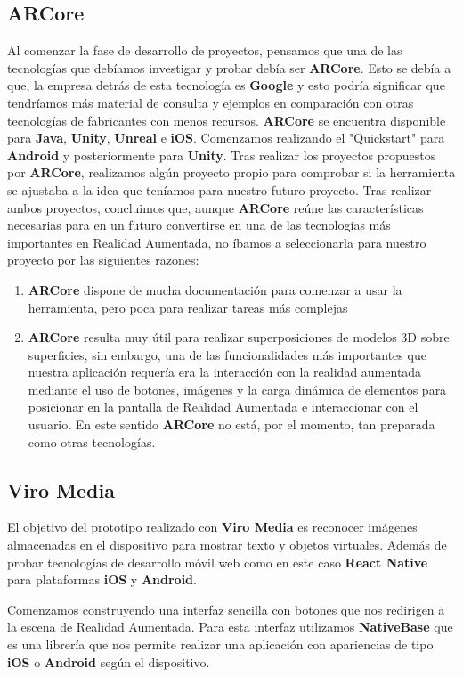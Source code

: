 \subsection{ARCore} 
\label{makereference3.6.1} 
\begin{flushleft}
    Al comenzar la fase de desarrollo de proyectos, pensamos que una de las tecnologías que debíamos 
    investigar y probar debía ser \textbf{ARCore}. Esto se debía a que, la empresa detrás de esta 
    tecnología es \textbf{Google} y esto podría significar que tendríamos más material de consulta 
    y ejemplos en comparación con otras tecnologías de fabricantes con menos recursos.
    \textbf{ARCore} se encuentra disponible para \textbf{Java}, \textbf{Unity}, \textbf{Unreal} e \textbf{iOS}. Comenzamos realizando el 
    "Quickstart" para \textbf{Android} y posteriormente para \textbf{Unity}. 
    Tras realizar los proyectos propuestos por \textbf{ARCore}, realizamos algún proyecto propio 
    para comprobar si la herramienta se ajustaba a la idea que teníamos para nuestro futuro proyecto.
    Tras realizar ambos proyectos, concluimos que, aunque \textbf{ARCore} reúne las características 
    necesarias para en un futuro convertirse en una de las tecnologías más importantes en Realidad Aumentada, 
    no íbamos a seleccionarla para nuestro proyecto por las siguientes razones:
    \begin{enumerate}
        \item \textbf{ARCore} dispone de mucha documentación para comenzar a usar la herramienta, pero poca para realizar tareas más complejas
        \item \textbf{ARCore} resulta muy útil para realizar superposiciones de modelos 3D sobre superficies, sin embargo, una de las funcionalidades más importantes que nuestra aplicación requería era la interacción con la realidad aumentada mediante el uso de botones, imágenes y la carga dinámica de elementos para posicionar en la pantalla de Realidad Aumentada e interaccionar con el usuario. En este sentido \textbf{ARCore} no está, por el momento, tan preparada como otras tecnologías.
    \end{enumerate}
    
\end{flushleft}
\subsection{Viro Media} 
\label{makereference3.6.2}
\begin{flushleft}
El objetivo del prototipo realizado con \textbf{Viro Media} es reconocer imágenes almacenadas en el dispositivo para mostrar texto y
 objetos virtuales. Además de probar tecnologías de desarrollo móvil web como en este caso \textbf{React Native}
 para plataformas \textbf{iOS} y \textbf{Android}.
\end{flushleft}
\begin{flushleft}
Comenzamos construyendo una interfaz sencilla con botones que nos redirigen a la escena de Realidad Aumentada.
Para esta interfaz utilizamos \textbf{NativeBase} que es una librería que nos permite
realizar una aplicación con apariencias de tipo \textbf{iOS} o \textbf{Android} según el dispositivo.
\end{flushleft}


